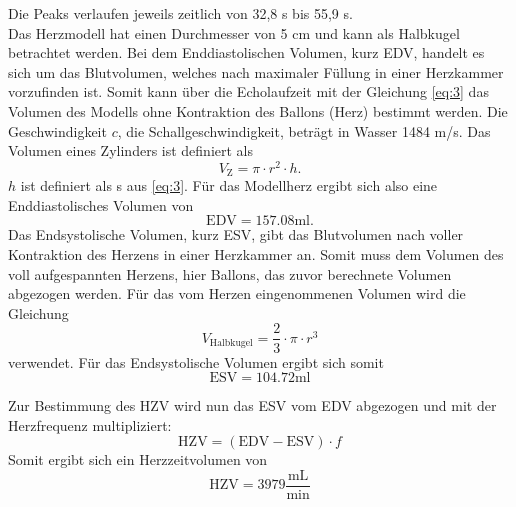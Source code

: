 Die Peaks verlaufen jeweils zeitlich von 32,8 \mu s bis 55,9 \mu s. 
\\
Das Herzmodell hat einen Durchmesser von 5 cm und kann als Halbkugel betrachtet werden. 
Bei dem Enddiastolischen Volumen, kurz EDV, handelt es sich um das Blutvolumen, welches nach maximaler Füllung in einer Herzkammer vorzufinden ist. Somit kann über die Echolaufzeit mit der Gleichung \ref{eq:3} das Volumen des Modells ohne Kontraktion des Ballons (Herz) bestimmt werden. 
Die Geschwindigkeit $c$, die Schallgeschwindigkeit, beträgt in Wasser 1484 m/s.
Das Volumen eines Zylinders ist definiert als
\begin{equation*}
	V_\text{Z} = \pi \cdot r^2 \cdot h  .
\end{equation*}
$h$ ist definiert als s aus \ref{eq:3}.
Für das Modellherz ergibt sich also eine Enddiastolisches Volumen von 
\begin{equation*}
	\text{EDV} = 157.08 \text{ml} .
\end{equation*}
Das Endsystolische Volumen, kurz ESV, gibt das Blutvolumen nach voller Kontraktion des Herzens in einer Herzkammer an. Somit muss dem Volumen des voll aufgespannten Herzens, hier Ballons, das zuvor berechnete Volumen abgezogen werden.
Für das vom Herzen eingenommenen Volumen wird die Gleichung
\begin{equation*}
	V_\text{Halbkugel} = \frac{2}{3} \cdot \pi \cdot r^3
\end{equation*}
verwendet.
Für das Endsystolische Volumen ergibt sich somit
\begin{equation*}
	\text{ESV} = 104.72 \text{ml}
\end{equation*}

Zur Bestimmung des HZV wird nun das ESV vom EDV abgezogen und mit der Herzfrequenz multipliziert:
\begin{equation*}
	\text{HZV} = (\text{EDV} - \text{ESV}) \cdot f
\end{equation*}
Somit ergibt sich ein Herzzeitvolumen von
\begin{equation*}
	\text{HZV} = 3979 \frac{\text{mL}}{\text{min}}
\end{equation*}
	


